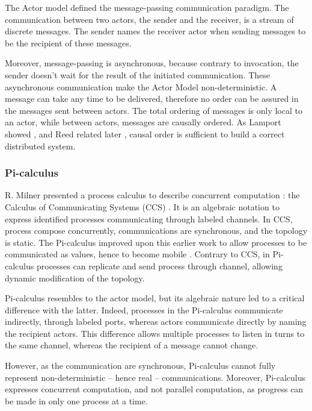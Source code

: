 The Actor model defined the message-passing communication paradigm.
The communication between two actors, the sender and the receiver, is a stream of discrete messages.
The sender names the receiver actor when sending messages to be the recipient of these messages.

Moreover, message-passing is asynchronous, because contrary to invocation, the sender doesn't wait for the result of the initiated communication.
These asynchronous communication make the Actor Model non-deterministic.
A message can take any time to be delivered, therefore no order can be assured in the messages sent between actors.
The total ordering of messages is only local to an actor, while between actors, messages are causally ordered.
As Lamport showed \cite{Lamport1978}, and Reed related later \cite{Reed2012}, causal order is sufficient to build a correct distributed system.

\subsubsection{Pi-calculus}

R. Milner presented a process calculus to describe concurrent computation : the Calculus of Communicating Systems (CCS) \cite{Milner1975, Milner1980}.
It is an algebraic notation to express identified processes communicating through labeled channels.
In CCS, process compose concurrently, communications are synchronous, and the topology is static.
The Pi-calculus improved upon this earlier work to allow processes to be communicated as values, hence to become mobile \cite{Engberg1986,Milner1992a,Milner1992}.
Contrary to CCS, in Pi-calculus processes can replicate and send process through channel, allowing dynamic modification of the topology.

Pi-calculus resembles to the actor model, but its algebraic nature led to a critical difference with the latter.
Indeed, processes in the Pi-calculus communicate indirectly, through labeled ports, whereas actors communicate directly by naming the recipient actors.
This difference allows multiple processes to listen in turns to the same channel, whereas the recipient of a message cannot change.



However, as the communication are synchronous, Pi-calculus cannot fully represent non-deterministic -- hence real -- communications.
Moreover, Pi-calculus expresses concurrent computation, and not parallel computation, as progress can be made in only one process at a time.


